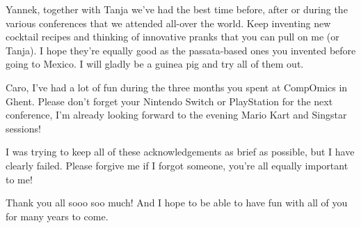 Yannek, together with Tanja we've had the best time before, after or during the various conferences that we attended all-over the world.
Keep inventing new cocktail recipes and thinking of innovative pranks that you can pull on me (or Tanja).
I hope they're equally good as the passata-based ones you invented before going to Mexico.
I will gladly be a guinea pig and try all of them out.

Caro, I've had a lot of fun during the three months you spent at CompOmics in Ghent.
Please don't forget your Nintendo Switch or PlayStation for the next conference, I'm already looking forward to the evening Mario Kart and Singstar sessions!

I was trying to keep all of these acknowledgements as brief as possible, but I have clearly failed.
Please forgive me if I forgot someone, you're all equally important to me!

Thank you all sooo soo much!
And I hope to be able to have fun with all of you for many years to come.
